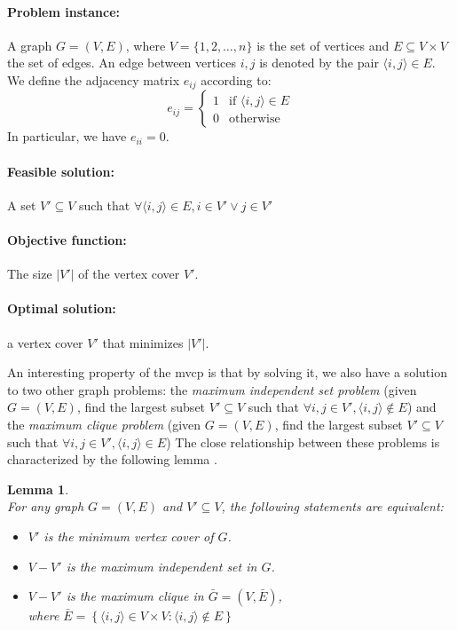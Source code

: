 \documentclass[12pt]{article}
\newtheorem{lemma}{Lemma}
\begin{document}
{
\setlength{\parskip}{0em}
\paragraph{Problem instance:}
A graph $G = (V, E)$, where $V = \{1, 2, \dots, n\}$
is the set of vertices and $E \subseteq V \times V$ the
set of edges.
An edge between vertices $i, j$ is denoted
by the pair $\langle i, j \rangle \in E$.
We define the adjacency matrix $e_{ij}$ according to:
\[
e_{ij} =
\begin{cases}
1 & \text{if } \langle i, j \rangle \in E \\
0 & \text{otherwise}
\end{cases}
\]
In particular, we have $e_{ii} = 0$.

\paragraph{Feasible solution:} A set $V' \subseteq V$ such that
$\forall \langle i, j \rangle \in E, i \in V' \vee j \in V'$
\paragraph{Objective function:} The size $|V'|$ of the vertex cover $V'$.
\paragraph{Optimal solution:} a vertex cover $V'$ that minimizes $|V'|$.
}

An interesting property of the mvcp is that by
solving it, we also have a solution to two other
graph problems: the \textit{maximum independent set problem}
(given $G = (V, E)$, find the largest subset $V' \subseteq V$
such that $\forall i, j \in V', \langle i, j \rangle \notin E$)
and the \textit{maximum clique problem}
(given $G = (V, E)$, find the largest subset $V' \subseteq V$
such that $\forall i, j \in V', \langle i, j \rangle \in E$)
The close relationship between these problems is characterized
by the following lemma \cite{6:misp}.
\begin{lemma}
\label{lem}
\ \\[3mm]
For any graph $G = (V, E)$ and $V' \subseteq V$, the following
statements are equivalent:
\begin{itemize}
\vspace{-3mm}
\setlength{\parskip}{0.5em}
\item $V'$ is the minimum vertex cover of $G$.
\item $V - V'$ is the maximum independent set in $G$.
\item $V - V'$ is the maximum clique in $\bar{G} = (V, \bar{E})$,\\[1mm]
where
$\bar{E}=\left\{ \langle i, j \rangle\in V \times V :
\langle i, j \rangle \notin E \right\}$
\end{itemize}
\end{lemma}
\end{document}
